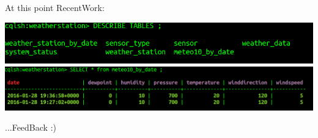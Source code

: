 \documentclass[12pt]{beamer}
\begin{document}
\begin{frame}{At this point}
\large RecentWork: 
\vspace*{-15pt}
\begin{center}
\includegraphics[scale=0.4]{tables.png} \vspace*{10pt}
\includegraphics[scale=0.3]{meteo10_by_date.png} \vspace*{10pt}
\end{center}
\normalsize ...FeedBack :)
\end{frame}
\end{document}
